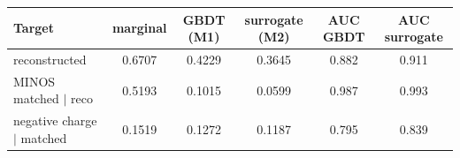 \begin{tabular}{lccccc}
\toprule
Target & marginal & GBDT (M1) & surrogate (M2) & AUC GBDT & AUC surrogate \\
\midrule
reconstructed & 0.6707 & 0.4229 & 0.3645 & 0.882 & 0.911 \\
MINOS matched $\mid$ reco & 0.5193 & 0.1015 & 0.0599 & 0.987 & 0.993 \\
negative charge $\mid$ matched & 0.1519 & 0.1272 & 0.1187 & 0.795 & 0.839 \\
\bottomrule
\end{tabular}
